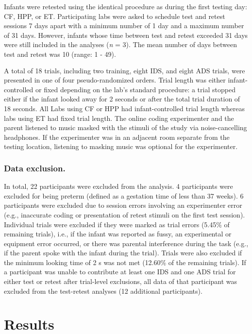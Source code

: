 \documentclass[
  man,floatsintext]{apa6}
\begin{document}
Infants were retested using the identical procedure as during the first testing day: CF, HPP, or ET.
Participating labs were asked to schedule test and retest sessions 7 days apart with a minimum number of 1 day and a maximum number of 31 days.
However, infants whose time between test and retest exceeded 31 days were still included in the analyses (\emph{n} = 3).
The mean number of days between test and retest was 10 (range: 1 - 49).

A total of 18 trials, including two training, eight IDS, and eight ADS trials, were presented in one of four pseudo-randomized orders.
Trial length was either infant-controlled or fixed depending on the lab's standard procedure: a trial stopped either if the infant looked away for 2 seconds or after the total trial duration of 18 seconds.
All Labs using CF or HPP had infant-controlled trial length whereas labs using ET had fixed trial length.
The online coding experimenter and the parent listened to music masked with the stimuli of the study via noise-cancelling headphones.
If the experimenter was in an adjacent room separate from the testing location, listening to masking music was optional for the experimenter.

\hypertarget{data-exclusion.}{%
\subsubsection{Data exclusion.}\label{data-exclusion.}}

In total, 22 participants were excluded from the analysis.
4 participants were excluded for being preterm (defined as a gestation time of less than 37 weeks).
6 participants were excluded due to session errors involving an experimenter error (e.g., inaccurate coding or presentation of retest stimuli on the first test session).
Individual trials were excluded if they were marked as trial errors (5.45\% of remaining trials), i.e., if the infant was reported as fussy, an experimental or equipment error occurred, or there was parental interference during the task (e.g., if the parent spoke with the infant during the trial).
Trials were also excluded if the minimum looking time of 2 s was not met (12.60\% of the remaining trials).
If a participant was unable to contribute at least one IDS and one ADS trial for either test or retest after trial-level exclusions, all data of that participant was excluded from the test-retest analyses (12 additional participants).

\hypertarget{results}{%
\section{Results}\label{results}}
\end{document}
